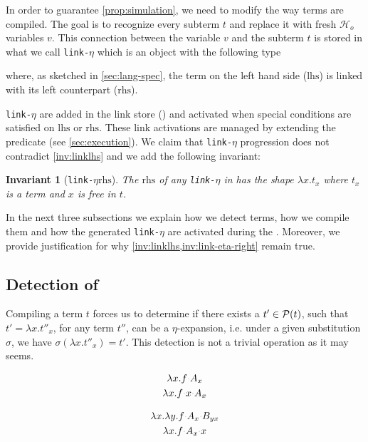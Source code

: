 \documentclass[sigconf,natbib=false,review]{acmart}
\newtheorem{invariant}{Invariant}
\newcommand{\appsep}{\ensuremath{\textcolor{lightgray}{\cdot}}}
\newcommand{\linketa}{\texttt{link-}\ensuremath{\eta}\xspace}
\newcommand{\Ho}{\ensuremath{\mathcal{H}_o}\xspace}
\newcommand{\lhs}{\ensuremath{\mathrm{lhs}}\xspace}
\newcommand{\rhs}{\ensuremath{\mathrm{rhs}}\xspace}
\begin{document}
In order to guarantee \cref{prop:simulation}, we need to modify the way terms are
compiled. The goal is to recognize
every \maybeeta subterm $t$ and replace it with fresh \Ho variables $v$. 
This connection between the variable $v$ and the subterm $t$ is stored in what we
call \linketa which is an object with the following type


\noindent
where, as sketched in \cref{sec:lang-spec}, the term on the left hand side
(\lhs) is linked with its left counterpart (\rhs).

\linketa are added in the link store (\linkStore) and activated when special
conditions are satisfied on \lhs or \rhs. These link activations are managed by
extending the  predicate (see \cref{sec:execution}).
We claim that \linketa progression does not contradict \cref{inv:linklhs} and we
add the following invariant:

\begin{invariant}[\linketa \rhs]
  The \rhs of any \linketa in \linkStore has the shape $\lambda x.t_x$
  where $t_x$ is a \maybeeta term and $x$ is free in $t$.
  \label{inv:link-eta-right}
\end{invariant}

In the next three subsections we explain how we detect \maybeeta terms, how we
compile them and how the generated \linketa are activated during the .
Moreover, we provide justification for why \cref{inv:linklhs,inv:link-eta-right} remain true.

\subsection{Detection of \maybeeta}

Compiling a term $t$ forces us to determine if there exists a $t' \in \mathcal{P}(t)$,
such that $t' = \lambda x. t''_x$,
for any term $t''$, can be a $\eta$-expansion, i.e. under a
given substitution $\sigma$, we have $\sigma (\lambda x.t''_x) = t'$. This
\maybeeta detection is not a trivial operation as it may seems.
\\
\noindent
\begin{minipage}{.5\linewidth}%
  \begin{gather}
    \lambda x. f \appsep A_x\\
    \lambda x. f \appsep x \appsep A_x
  \end{gather}
\end{minipage}%
\begin{minipage}{.5\linewidth}
  \begin{gather}
    \lambda x. \lambda y. f \appsep A_x \appsep B_{y x} \label{eq:lamlam}\\
    \lambda x. f \appsep A_x \appsep x \label{eq:lamdisc}
  \end{gather}
\end{minipage}
\end{document}

